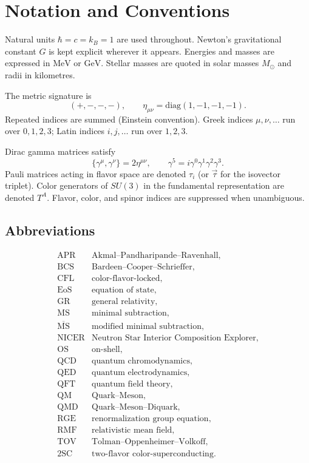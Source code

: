 \chapter{Notation and Conventions}

Natural units \(\hbar = c = k_B = 1\) are used throughout. Newton's
gravitational constant \(G\) is kept explicit wherever it appears.
Energies and masses are expressed in \(\mathrm{MeV}\) or
\(\mathrm{GeV}\). Stellar masses are quoted in solar masses \(M_\odot\)
and radii in kilometres.

The metric signature is
\[
    (+,-,-,-),
    \qquad
    \eta_{\mu\nu} = \mathrm{diag}(1,-1,-1,-1).
\]
Repeated indices are summed (Einstein convention). Greek indices
\(\mu,\nu,\ldots\) run over \(0,1,2,3\); Latin indices \(i,j,\ldots\)
run over \(1,2,3\).

Dirac gamma matrices satisfy
\[
    \{\gamma^\mu,\gamma^\nu\} = 2\eta^{\mu\nu},
    \qquad
    \gamma^5 = i\gamma^0\gamma^1\gamma^2\gamma^3.
\]
Pauli matrices acting in flavor space are denoted \(\tau_i\) (or
\(\vec{\tau}\) for the isovector triplet). Color generators of
\(SU(3)\) in the fundamental representation are denoted \(T^A\).
Flavor, color, and spinor indices are suppressed when unambiguous.

\section*{Abbreviations}

\[
\begin{array}{ll}
\mathrm{APR}   & \text{Akmal--Pandharipande--Ravenhall},\\
\mathrm{BCS}   & \text{Bardeen--Cooper--Schrieffer},\\
\mathrm{CFL}   & \text{color-flavor-locked},\\
\mathrm{EoS}   & \text{equation of state},\\
\mathrm{GR}    & \text{general relativity},\\
\mathrm{MS}    & \text{minimal subtraction},\\
\overline{\mathrm{MS}}
               & \text{modified minimal subtraction},\\
\mathrm{NICER} & \text{Neutron Star Interior Composition Explorer},\\
\mathrm{OS}    & \text{on-shell},\\
\mathrm{QCD}   & \text{quantum chromodynamics},\\
\mathrm{QED}   & \text{quantum electrodynamics},\\
\mathrm{QFT}   & \text{quantum field theory},\\
\mathrm{QM}    & \text{Quark--Meson},\\
\mathrm{QMD}   & \text{Quark--Meson--Diquark},\\
\mathrm{RGE}   & \text{renormalization group equation},\\
\mathrm{RMF}   & \text{relativistic mean field},\\
\mathrm{TOV}   & \text{Tolman--Oppenheimer--Volkoff},\\
\mathrm{2SC}   & \text{two-flavor color-superconducting}.
\end{array}
\]
